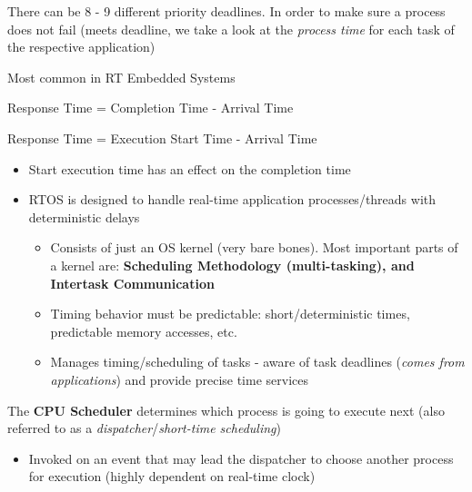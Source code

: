 \documentclass[a4paper,11pt]{article}
\begin{document}
There can be 8 - 9 different priority deadlines. In order to make sure a process does not fail (meets deadline, we take a look at the \emph{process time} for each task of the respective application)\par



Most common in RT Embedded Systems\par



Response Time = Completion Time - Arrival Time\par

Response Time = Execution Start Time - Arrival Time\par

\Needspace{28pt}
\begin{itemize}
\item Start execution time has an effect on the completion time
\end{itemize}



\Needspace{125pt}



\Needspace{100pt}
\begin{itemize}
\item RTOS is designed to handle real-time application processes/threads with deterministic delays
\begin{itemize}
\item Consists of just an OS kernel (very bare bones). Most important parts of a kernel are: \textbf{Scheduling Methodology (multi-tasking), and Intertask Communication}
\item Timing behavior must be predictable: short/deterministic times, predictable memory accesses, etc.
\item Manages timing/scheduling of tasks - aware of task deadlines (\emph{comes from applications}) and provide precise time services
\end{itemize}
\end{itemize}



\Needspace{140pt}



The \textbf{CPU Scheduler} determines which process is going to execute next (also referred to as a \emph{dispatcher}/\emph{short-time scheduling})\par

\Needspace{40pt}
\begin{itemize}
\item Invoked on an event that may lead the dispatcher to choose another process for execution (highly dependent on real-time clock)
\end{itemize}
\end{document}
